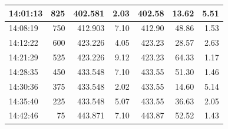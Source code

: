 \begin{table}[ht!]
\begin{adjustbox}{max width=\textwidth}
\begin{tabular}{|l|r|r|r|r|r|r|}
14:01:13 &                825 &         402.581 &       2.03 &         402.58 &  13.62 &  5.51 \\ \hline
14:08:19 &                750 &         412.903 &       7.10 &         412.90 &  48.86 &  1.53 \\ \hline
14:12:22 &                600 &         423.226 &       4.05 &         423.23 &  28.57 &  2.63 \\ \hline
14:21:29 &                525 &         423.226 &       9.12 &         423.23 &  64.33 &  1.17 \\ \hline
14:28:35 &                450 &         433.548 &       7.10 &         433.55 &  51.30 &  1.46 \\ \hline
14:30:36 &                375 &         433.548 &       2.02 &         433.55 &  14.60 &  5.14 \\ \hline
14:35:40 &                225 &         433.548 &       5.07 &         433.55 &  36.63 &  2.05 \\ \hline
14:42:46 &                 75 &         443.871 &       7.10 &         443.87 &  52.52 &  1.43 \\ \hline


\end{tabular}
\label{table:cop_calc}
\end{adjustbox}
\end{table}



\newpage

